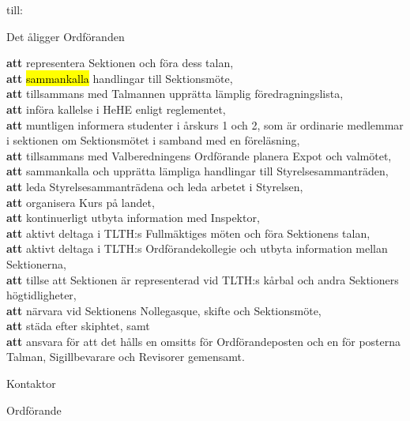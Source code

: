 \documentclass[../_main/handlingar.tex]{subfiles}
\begin{document}
\begin{attsatser}
    till:\par
    \begin{itshape}
    Det åligger Ordföranden\par
    \textbf{att} representera Sektionen och föra dess talan,\\
    \textbf{att} \hl{sammankalla} handlingar till Sektionsmöte,\\
    \textbf{att} tillsammans med Talmannen upprätta lämplig föredragningslista,\\
    \textbf{att} införa kallelse i HeHE enligt reglementet,\\
    \textbf{att} muntligen informera studenter i årskurs 1 och 2, som är ordinarie medlemmar i sektionen om Sektionsmötet i samband med en föreläsning,\\
    \textbf{att} tillsammans med Valberedningens Ordförande planera Expot och valmötet,\\
    \textbf{att} sammankalla och upprätta lämpliga handlingar till Styrelsesammanträden,\\
    \textbf{att} leda Styrelsesammanträdena och leda arbetet i Styrelsen,\\
    \textbf{att} organisera Kurs på landet,\\
    \textbf{att} kontinuerligt utbyta information med Inspektor,\\
    \textbf{att} aktivt deltaga i TLTH:s Fullmäktiges möten och föra Sektionens talan,\\
    \textbf{att} aktivt deltaga i TLTH:s Ordförandekollegie och utbyta information mellan Sektionerna,\\
    \textbf{att} tillse att Sektionen är representerad vid TLTH:s kårbal och andra Sektioners högtidligheter,\\
    \textbf{att} närvara vid Sektionens Nollegasque, skifte och Sektionsmöte,\\
    \textbf{att} städa efter skiphtet, samt\\
    \textbf{att} ansvara för att det hålls en omsitts för Ordförandeposten och en för posterna Talman, Sigillbevarare och Revisorer gemensamt.
    \end{itshape}

    \changenote
\end{attsatser}

\begin{signatures}{2}
    \ist
    \signature{Erik Månsson}{Kontaktor}
    \signature{Fredrik Peterson}{Ordförande}
\end{signatures}
\end{document}
